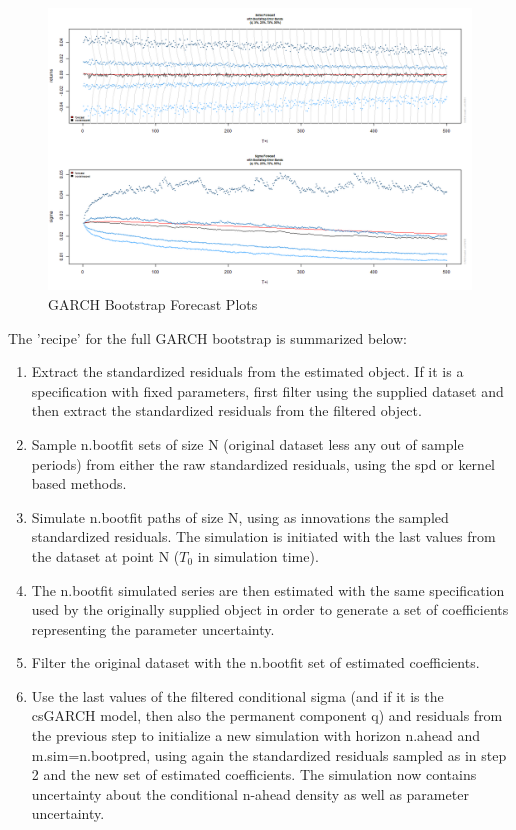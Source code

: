 \begin{figure}
\centering
\includegraphics{boot_partial.png}
\caption[GARCH Bootstrap Forecast Plots]{GARCH Bootstrap Forecast Plots}\label{fig:bootplot}
\end{figure}
The 'recipe' for the full GARCH bootstrap is summarized below:
\begin{enumerate}
\item Extract the standardized residuals from the estimated object. If it is a specification with
fixed parameters, first filter using the supplied dataset and then extract the standardized
residuals from the filtered object.
\item Sample n.bootfit sets of size N (original dataset less any out of sample periods) from either
the raw standardized residuals, using the spd or kernel based methods.
\item Simulate n.bootfit paths of size N, using as innovations the sampled standardized residuals. The
simulation is initiated with the last values from the dataset at point N ($T_0$ in simulation time).
\item The n.bootfit simulated series are then estimated with the same specification used by the originally
supplied object in order to generate a set of coefficients representing the parameter uncertainty.
\item Filter the original dataset with the n.bootfit set of estimated coefficients.
\item Use the last values of the filtered conditional sigma (and if it is the csGARCH model, then also the
permanent component q) and residuals from the previous step to initialize a new simulation with horizon
n.ahead and m.sim=n.bootpred, using again the standardized residuals sampled as in step 2 and the new set of
estimated coefficients. The simulation now contains uncertainty about the conditional n-ahead density as well
as parameter uncertainty.
\end{enumerate}
